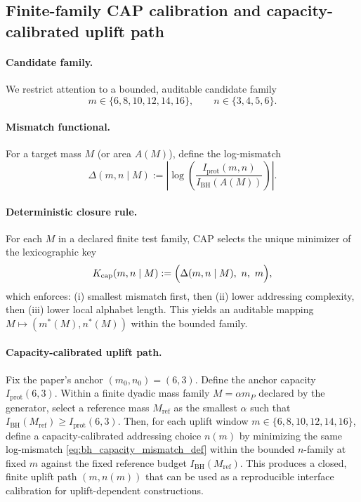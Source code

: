 \subsection{Finite-family CAP calibration and capacity-calibrated uplift path}
\label{subsec:bh_capacity_cap_calibration}

\paragraph{Candidate family.}
\AuditTag We restrict attention to a bounded, auditable candidate family
\[
m\in\{6,8,10,12,14,16\},
\qquad
n\in\{3,4,5,6\}.
\]

\paragraph{Mismatch functional.}
\AuditTag For a target mass $M$ (or area $A(M)$), define the log-mismatch
\begin{equation}
\label{eq:bh_capacity_mismatch_def}
\Delta(m,n\mid M)
:=
\left|\log\!\left(\frac{I_{\mathrm{prot}}(m,n)}{I_{\mathrm{BH}}(A(M))}\right)\right|.
\end{equation}

\paragraph{Deterministic closure rule.}
\AuditTag For each $M$ in a declared finite test family, CAP selects the unique minimizer of the lexicographic key
\[
K_{\mathrm{cap}}(m,n\mid M)
:=
\Bigl(\Delta(m,n\mid M),\ n,\ m\Bigr),
\]
which enforces: (i) smallest mismatch first, then (ii) lower addressing complexity, then (iii) lower local alphabet length.
This yields an auditable mapping $M\mapsto (m^\ast(M),n^\ast(M))$ within the bounded family.

\paragraph{Capacity-calibrated uplift path.}
\AuditTag Fix the paper's anchor $(m_0,n_0)=(6,3)$.
Define the anchor capacity $I_{\mathrm{prot}}(6,3)$.
Within a finite dyadic mass family $M=\alpha m_P$ declared by the generator, select a reference mass $M_{\mathrm{ref}}$ as the smallest $\alpha$ such that
$I_{\mathrm{BH}}(M_{\mathrm{ref}})\ge I_{\mathrm{prot}}(6,3)$.
Then, for each uplift window $m\in\{6,8,10,12,14,16\}$, define a capacity-calibrated addressing choice $n(m)$ by minimizing the same log-mismatch \eqref{eq:bh_capacity_mismatch_def}
within the bounded $n$-family at fixed $m$ against the fixed reference budget $I_{\mathrm{BH}}(M_{\mathrm{ref}})$.
This produces a closed, finite uplift path $(m,n(m))$ that can be used as a reproducible interface calibration for uplift-dependent constructions.


